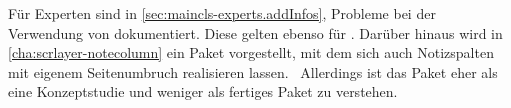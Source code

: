Für Experten sind in
\autoref{sec:maincls-experts.addInfos},
 Probleme bei der Verwendung von
 dokumentiert. Diese gelten ebenso für .
Darüber hinaus wird in \autoref{cha:scrlayer-notecolumn} ein Paket
vorgestellt, mit dem sich auch Notizspalten mit eigenem Seitenumbruch
realisieren lassen.%
\iftrue%
  \ Allerdings ist das Paket
  \hyperref[cha:scrlayer-notecolumn]{}%
   eher als
  eine Konzeptstudie und weniger als fertiges Paket zu verstehen.%
\fi%
%
\EndIndexGroup
%
\EndIndexGroup


